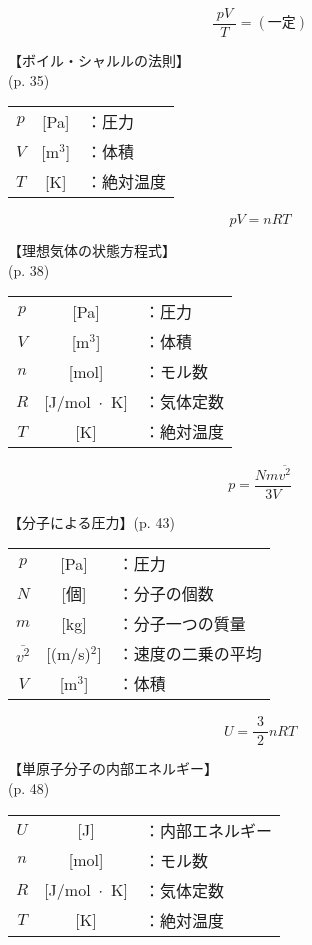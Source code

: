 \documentclass[10pt]{jarticle}
\begin{document}
\newpage
\[
	\frac{\; pV \;}{T}= (一定)
\]


\vskip3mm
【ボイル・シャルルの法則】\\
\hfill {\footnotesize (p. 35)}

\begin{tabular}{ccl}
$p$	&[Pa]	&：圧力\\
$V$	&[m$^3$]	&：体積\\
$T$	&[K]	&：絶対温度
\end{tabular}




\newpage
\[
	p V = n R T
\]


\vskip3mm
【理想気体の状態方程式】\\
\hfill {\footnotesize (p. 38)}

\begin{tabular}{ccl}
$p$	&[Pa]	&：圧力\\
$V$	&[m$^3$]	&：体積\\
$n$	&[mol]	&：モル数\\
$R$	&[J/mol $\!\! \cdot \!\! $ K]	&：気体定数\\
$T$	&[K]	&：絶対温度
\end{tabular}





\newpage
\[
	p = \frac{N m \overline{v^2}}{3V}
\]


\vskip3mm
【分子による圧力】{\footnotesize (p. 43)}

\begin{tabular}{ccl}
$p$	&[Pa]	&：圧力\\
$N$	&[個]	&：分子の個数\\
$m$	&[kg]	&：分子一つの質量\\
$\overline{v^2}$	&[(m/s)$^2$]	&：{\small 速度の二乗の平均}\\
$V$	&[m$^3$]	&：体積
\end{tabular}






\newpage
\[
	U = \frac{3}{\; 2 \;} n RT
\]


\vskip3mm
【単原子分子の内部エネルギー】\\
\hfill {\footnotesize (p. 48)}

\begin{tabular}{ccl}
$U$	&[J]	&：内部エネルギー\\
$n$	&[mol]	&：モル数\\
$R$	&[J/mol $\!\! \cdot \!\! $ K]	&：気体定数\\
$T$	&[K]	&：絶対温度
\end{tabular}
\end{document}
